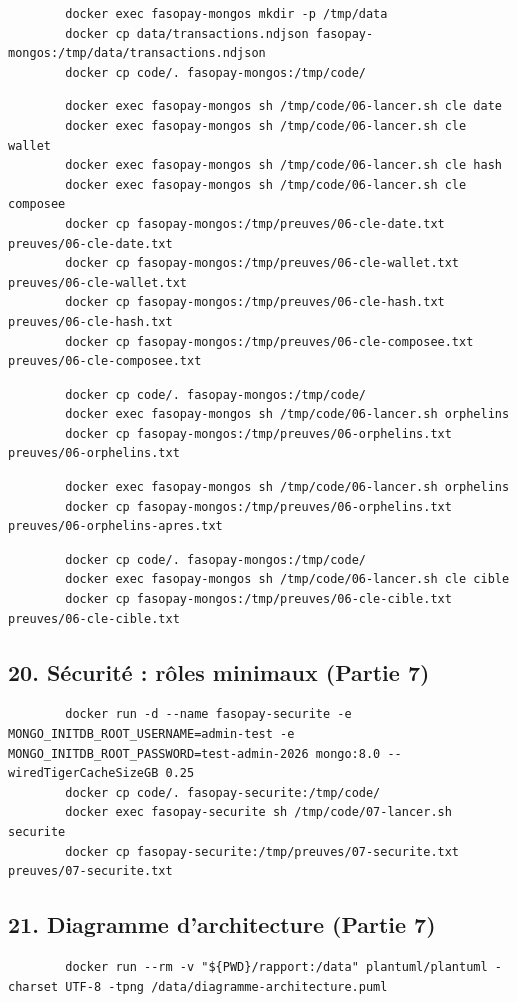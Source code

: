 \documentclass[11pt,a4paper]{article}
\begin{document}
	\begin{lstlisting}
		docker exec fasopay-mongos mkdir -p /tmp/data
		docker cp data/transactions.ndjson fasopay-mongos:/tmp/data/transactions.ndjson
		docker cp code/. fasopay-mongos:/tmp/code/
	\end{lstlisting}
	\begin{lstlisting}
		docker exec fasopay-mongos sh /tmp/code/06-lancer.sh cle date
		docker exec fasopay-mongos sh /tmp/code/06-lancer.sh cle wallet
		docker exec fasopay-mongos sh /tmp/code/06-lancer.sh cle hash
		docker exec fasopay-mongos sh /tmp/code/06-lancer.sh cle composee
		docker cp fasopay-mongos:/tmp/preuves/06-cle-date.txt preuves/06-cle-date.txt
		docker cp fasopay-mongos:/tmp/preuves/06-cle-wallet.txt preuves/06-cle-wallet.txt
		docker cp fasopay-mongos:/tmp/preuves/06-cle-hash.txt preuves/06-cle-hash.txt
		docker cp fasopay-mongos:/tmp/preuves/06-cle-composee.txt preuves/06-cle-composee.txt
	\end{lstlisting}
	\begin{lstlisting}
		docker cp code/. fasopay-mongos:/tmp/code/
		docker exec fasopay-mongos sh /tmp/code/06-lancer.sh orphelins
		docker cp fasopay-mongos:/tmp/preuves/06-orphelins.txt preuves/06-orphelins.txt
	\end{lstlisting}
	\begin{lstlisting}
		docker exec fasopay-mongos sh /tmp/code/06-lancer.sh orphelins
		docker cp fasopay-mongos:/tmp/preuves/06-orphelins.txt preuves/06-orphelins-apres.txt
	\end{lstlisting}
	\begin{lstlisting}
		docker cp code/. fasopay-mongos:/tmp/code/
		docker exec fasopay-mongos sh /tmp/code/06-lancer.sh cle cible
		docker cp fasopay-mongos:/tmp/preuves/06-cle-cible.txt preuves/06-cle-cible.txt
	\end{lstlisting}
	\subsection*{20. Sécurité : rôles minimaux (Partie 7)}
	\begin{lstlisting}
		docker run -d --name fasopay-securite -e MONGO_INITDB_ROOT_USERNAME=admin-test -e MONGO_INITDB_ROOT_PASSWORD=test-admin-2026 mongo:8.0 --wiredTigerCacheSizeGB 0.25
		docker cp code/. fasopay-securite:/tmp/code/
		docker exec fasopay-securite sh /tmp/code/07-lancer.sh securite
		docker cp fasopay-securite:/tmp/preuves/07-securite.txt preuves/07-securite.txt
	\end{lstlisting}
	\subsection*{21. Diagramme d'architecture (Partie 7)}
	\begin{lstlisting}
		docker run --rm -v "${PWD}/rapport:/data" plantuml/plantuml -charset UTF-8 -tpng /data/diagramme-architecture.puml
	\end{lstlisting}
\end{document}
